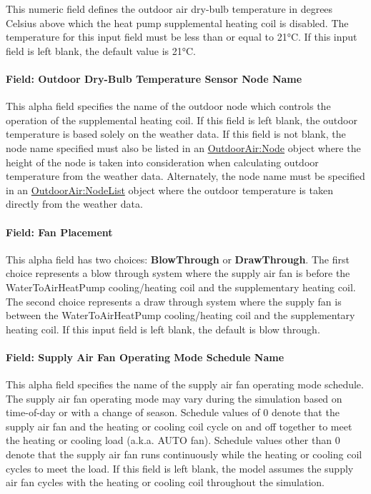 This numeric field defines the outdoor air dry-bulb temperature in degrees Celsius above which the heat pump supplemental heating coil is disabled. The temperature for this input field must be less than or equal to 21\si{\degreeCelsius}. If this input field is left blank, the default value is 21\si{\degreeCelsius}.

\paragraph{Field: Outdoor Dry-Bulb Temperature Sensor Node Name}\label{field-outdoor-dry-bulb-temperature-sensor-node-name-000}

This alpha field specifies the name of the outdoor node which controls the operation of the supplemental heating coil. If this field is left blank, the outdoor temperature is based solely on the weather data. If this field is not blank, the node name specified must also be listed in an \hyperref[outdoorairnode]{OutdoorAir:Node} object where the height of the node is taken into consideration when calculating outdoor temperature from the weather data. Alternately, the node name must be specified in an \hyperref[outdoorairnodelist]{OutdoorAir:NodeList} object where the outdoor temperature is taken directly from the weather data.

\paragraph{Field: Fan Placement}\label{field-fan-placement-5-000}

This alpha field has two choices: \textbf{BlowThrough} or \textbf{DrawThrough}. The first choice represents a blow through system where the supply air fan is before the WaterToAirHeatPump cooling/heating coil and the supplementary heating coil. The second choice represents a draw through system where the supply fan is between the WaterToAirHeatPump cooling/heating coil and the supplementary heating coil. If this input field is left blank, the default is blow through.

\paragraph{Field: Supply Air Fan Operating Mode Schedule Name}\label{field-supply-air-fan-operating-mode-schedule-name-6}

This alpha field specifies the name of the supply air fan operating mode schedule. The supply air fan operating mode may vary during the simulation based on time-of-day or with a change of season. Schedule values of 0 denote that the supply air fan and the heating or cooling coil cycle on and off together to meet the heating or cooling load (a.k.a. AUTO fan). Schedule values other than 0 denote that the supply air fan runs continuously while the heating or cooling coil cycles to meet the load. If this field is left blank, the model assumes the supply air fan cycles with the heating or cooling coil throughout the simulation.

